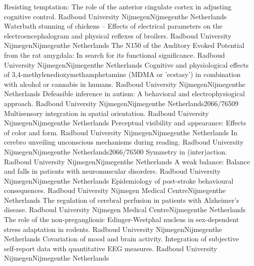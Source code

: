 	{Resisting temptation: The role of the anterior cingulate cortex in adjusting cognitive control.}
	{Radboud University Nijmegen}{Nijmegen}{the Netherlands}{}
	{Waterbath stunning of chickens – Effects of electrical parameters on the electroencephalogram and physical reflexes of broilers.}
	{Radboud University Nijmegen}{Nijmegen}{the Netherlands}{}
	{The N150 of the Auditory Evoked Potential from the rat amygdala: In search for its functional significance.}
	{Radboud University Nijmegen}{Nijmegen}{the Netherlands}{}
	{Cognitive and physiological effects of 3,4-methylenedioxymethamphetamine (MDMA or ’ecstasy’) in combination with alcohol or cannabis in humans.}
	{Radboud University Nijmegen}{Nijmegen}{the Netherlands}{}
	{Defeasible inference in autism: A behavioral and electrophysiogical approach.}
	{Radboud University Nijmegen}{Nijmegen}{the Netherlands}{2066/76509}
	{Multisensory integration in spatial orientation.}
	{Radboud University Nijmegen}{Nijmegen}{the Netherlands}{}
	{Perceptual visibility and appearance: Effects of color and form.}
	{Radboud University Nijmegen}{Nijmegen}{the Netherlands}{}
	{In cerebro unveiling unconscious mechanisms during reading.}
	{Radboud University Nijmegen}{Nijmegen}{the Netherlands}{2066/76500}
	{Symmetry in (inter)action.}
	{Radboud University Nijmegen}{Nijmegen}{the Netherlands}{}
	{A weak balance: Balance and falls in patients with neuromuscular disorders.}
	{Radboud University Nijmegen}{Nijmegen}{the Netherlands}{}
	{Epidemiology of post-stroke behavioural consequences.}
	{Radboud University Nijmegen Medical Centre}{Nijmegen}{the Netherlands}{}
	{The regulation of cerebral perfusion in patients with Alzheimer’s disease.}
	{Radboud University Nijmegen Medical Centre}{Nijmegen}{the Netherlands}{}
	{The role of the non-preganglionic Edinger-Westphal nucleus in sex-dependent stress adaptation in rodents.}
	{Radboud University Nijmegen}{Nijmegen}{the Netherlands}{}
	{Covariation of mood and brain activity. Integration of subjective self-report data with quantitative EEG measures.}
	{Radboud University Nijmegen}{Nijmegen}{the Netherlands}{}
